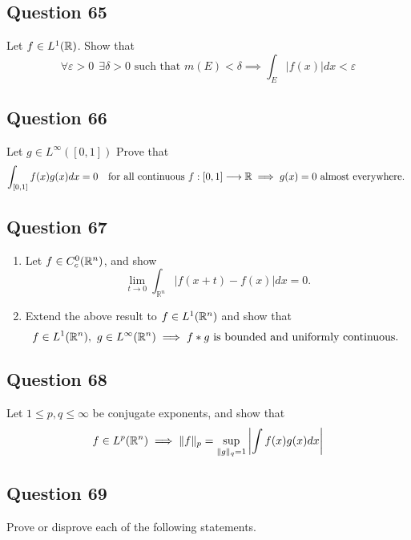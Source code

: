 \documentclass[12pt]{article}
\begin{document}
\hypertarget{question-65-1}{%
\subsection{Question 65}\label{question-65-1}}

Let \(f\in L^1({\mathbb{R}})\). Show that \[
\forall\varepsilon > 0 ~~\exists \delta > 0 \text{ such that } m(E) < \delta \implies \int_{E}|f(x)| d x<\varepsilon
\]

\hypertarget{question-66-1}{%
\subsection{Question 66}\label{question-66-1}}

Let \(g\in L^\infty([0, 1])\) Prove that \[
\int_{[0,1]} f(x) g(x) d x=0 \quad\text{for all continuous } f:[0, 1] \longrightarrow {\mathbb{R}} \implies g(x) = 0 \text{ almost everywhere. }
\]

\hypertarget{question-67-1}{%
\subsection{Question 67}\label{question-67-1}}

\begin{enumerate}
\def\labelenumi{\arabic{enumi}.}
\item
  Let \(f \in C_c^0({\mathbb{R}}^n)\), and show \[
  \lim _{t \rightarrow 0} \int_{\mathbb{R}^{n}}|f(x+t)-f(x)| d x=0.
  \]
\item
  Extend the above result to \(f\in L^1({\mathbb{R}}^n)\) and show that \[
  f\in L^1({\mathbb{R}}^n),~ g\in L^\infty({\mathbb{R}}^n) \implies f \ast g \text{ is bounded and uniformly continuous. }
  \]
\end{enumerate}

\hypertarget{question-68-1}{%
\subsection{Question 68}\label{question-68-1}}

Let \(1 \leq p,q \leq \infty\) be conjugate exponents, and show that \[
f \in L^p({\mathbb{R}}^n) \implies \|f\|_{p}=\sup _{\|g\|_{q}=1}\left|\int f(x) g(x) d x\right|
\]

\hypertarget{question-69-1}{%
\subsection{Question 69}\label{question-69-1}}

Prove or disprove each of the following statements.
\end{document}
